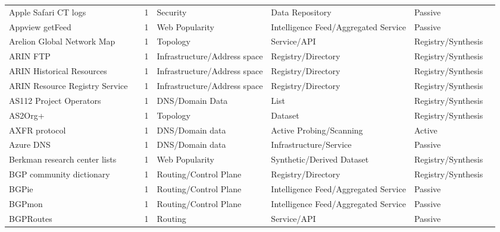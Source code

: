 \begin{table}[h!]
\begin{tabular}{lllllll}
Apple Safari CT logs & \cite{apple_safari_ct} & 1 & Security & Data Repository & Passive & \cite{10.1145/3618257.3624802} \\
Appview getFeed & \cite{appview_getfeed} & 1 & Web Popularity & Intelligence Feed/Aggregated Service & Passive & \cite{10.1145/3646547.3688407} \\
Arelion Global Network Map & \cite{arelion} & 1 & Topology & Service/API & Registry/Synthesis & \cite{10.1145/3777912.3809135} \\
ARIN FTP & \cite{arin_ftp} & 1 & Infrastructure/Address space & Registry/Directory & Registry/Synthesis & \cite{10.1145/3487552.3487838} \\
ARIN Historical Resources & \cite{arin_erx} & 1 & Infrastructure/Address space & Registry/Directory & Registry/Synthesis & \cite{10.1145/3487552.3487838} \\
ARIN Resource Registry Service & \cite{arin_rrs} & 1 & Infrastructure/Address space & Registry/Directory & Registry/Synthesis & \cite{10.1145/3730567.3764452} \\
AS112 Project Operators & \cite{as112} & 1 & DNS/Domain Data & List & Registry/Synthesis & \cite{10.1007/978-3-032-18268-5_9} \\
AS2Org+ & \cite{10.1007/978-3-031-28486-1_17} & 1 & Topology & Dataset & Registry/Synthesis & \cite{10.1145/3777912.3809155} \\
AXFR protocol & \cite{axfr_protocol} & 1 & DNS/Domain data & Active Probing/Scanning & Active & \cite{10.1145/3730567.3764501} \\
Azure DNS & \cite{azure_dns} & 1 & DNS/Domain data & Infrastructure/Service & Passive & \cite{10.1007/978-3-030-72582-2_14} \\
Berkman research center lists & \cite{berkman_lists} & 1 & Web Popularity & Synthetic/Derived Dataset & Registry/Synthesis & \cite{10.1145/3618257.3624817} \\
BGP community dictionary & \cite{bgp_community_dict} & 1 & Routing/Control Plane & Registry/Directory & Registry/Synthesis & \cite{10.1145/3730567.3732924} \\
BGPie & \cite{bgpie} & 1 & Routing/Control Plane & Intelligence Feed/Aggregated Service & Passive & \cite{10.1007/978-3-030-72582-2_13} \\
BGPmon & \cite{bgpmon} & 1 & Routing/Control Plane & Intelligence Feed/Aggregated Service & Passive & \cite{10.1145/3487552.3487838} \\
BGPRoutes & \cite{bgproutes} & 1 & Routing & Service/API & Passive & \cite{10.1145/3777912.3839829} \\

\end{tabular}
\end{table}
